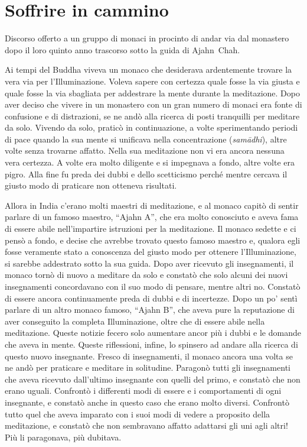 \chapter{Soffrire in cammino}

\begin{openingQuote}
  \centering

  Discorso offerto a un gruppo di monaci in procinto di andar via dal monastero
  dopo il loro quinto anno trascorso sotto la guida di Ajahn~Chah.
\end{openingQuote}

Ai tempi del Buddha viveva un monaco che desiderava ardentemente trovare
la vera via per l'Illuminazione. Voleva sapere con certezza quale fosse
la via giusta e quale fosse la via sbagliata per addestrare la mente
durante la meditazione. Dopo aver deciso che vivere in un monastero con
un gran numero di monaci era fonte di confusione e di distrazioni, se ne
andò alla ricerca di posti tranquilli per meditare da solo. Vivendo da
solo, praticò in continuazione, a volte sperimentando periodi di pace
quando la sua mente si unificava nella concentrazione (\emph{samādhi}),
altre volte senza trovarne affatto. Nella sua meditazione non vi era
ancora nessuna vera certezza. A volte era molto diligente e si impegnava
a fondo, altre volte era pigro. Alla fine fu preda dei dubbi e dello
scetticismo perché mentre cercava il giusto modo di praticare non
otteneva risultati.

Allora in India c'erano molti maestri di meditazione, e al monaco capitò
di sentir parlare di un famoso maestro, ``Ajahn A'', che era molto
conosciuto e aveva fama di essere abile nell'impartire istruzioni per la
meditazione. Il monaco sedette e ci pensò a fondo, e decise che avrebbe
trovato questo famoso maestro e, qualora egli fosse veramente stato a
conoscenza del giusto modo per ottenere l'Illuminazione, si sarebbe
addestrato sotto la sua guida. Dopo aver ricevuto gli insegnamenti, il
monaco tornò di nuovo a meditare da solo e constatò che solo alcuni dei
nuovi insegnamenti concordavano con il suo modo di pensare, mentre altri
no. Constatò di essere ancora continuamente preda di dubbi e di
incertezze. Dopo un po' sentì parlare di un altro monaco famoso, ``Ajahn
B'', che aveva pure la reputazione di aver conseguito la completa
Illuminazione, oltre che di essere abile nella meditazione. Queste
notizie fecero solo aumentare ancor più i dubbi e le domande che aveva
in mente. Queste riflessioni, infine, lo spinsero ad andare alla ricerca
di questo nuovo insegnante. Fresco di insegnamenti, il monaco ancora una
volta se ne andò per praticare e meditare in solitudine. Paragonò tutti
gli insegnamenti che aveva ricevuto dall'ultimo insegnante con quelli
del primo, e constatò che non erano uguali. Confrontò i differenti modi
di essere e i comportamenti di ogni insegnante, e constatò anche in
questo caso che erano molto diversi. Confrontò tutto quel che aveva
imparato con i suoi modi di vedere a proposito della meditazione, e
constatò che non sembravano affatto adattarsi gli uni agli altri! Più li
paragonava, più dubitava.

